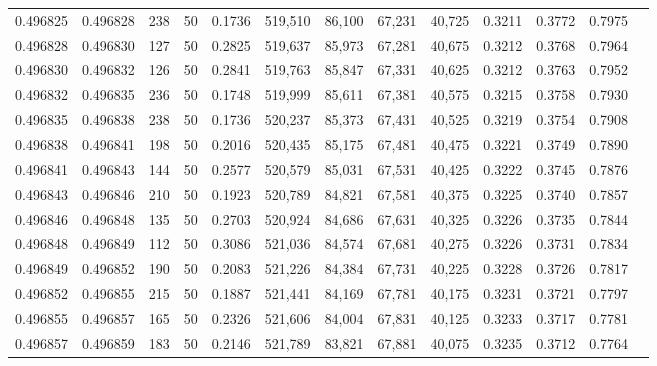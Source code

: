 \begin{tabular}{rrrrrrrrrrrrr}
0.496825 & 0.496828 &   238 &  50 &                                     0.1736 & 519,510 &  86,100 &  67,231 &  40,725 & 0.3211 & 0.3772 & 0.7975 \\
0.496828 & 0.496830 &   127 &  50 &                                     0.2825 & 519,637 &  85,973 &  67,281 &  40,675 & 0.3212 & 0.3768 & 0.7964 \\
0.496830 & 0.496832 &   126 &  50 &                                     0.2841 & 519,763 &  85,847 &  67,331 &  40,625 & 0.3212 & 0.3763 & 0.7952 \\
0.496832 & 0.496835 &   236 &  50 &                                     0.1748 & 519,999 &  85,611 &  67,381 &  40,575 & 0.3215 & 0.3758 & 0.7930 \\
0.496835 & 0.496838 &   238 &  50 &                                     0.1736 & 520,237 &  85,373 &  67,431 &  40,525 & 0.3219 & 0.3754 & 0.7908 \\
0.496838 & 0.496841 &   198 &  50 &                                     0.2016 & 520,435 &  85,175 &  67,481 &  40,475 & 0.3221 & 0.3749 & 0.7890 \\
0.496841 & 0.496843 &   144 &  50 &                                     0.2577 & 520,579 &  85,031 &  67,531 &  40,425 & 0.3222 & 0.3745 & 0.7876 \\
0.496843 & 0.496846 &   210 &  50 &                                     0.1923 & 520,789 &  84,821 &  67,581 &  40,375 & 0.3225 & 0.3740 & 0.7857 \\
0.496846 & 0.496848 &   135 &  50 &                                     0.2703 & 520,924 &  84,686 &  67,631 &  40,325 & 0.3226 & 0.3735 & 0.7844 \\
0.496848 & 0.496849 &   112 &  50 &                                     0.3086 & 521,036 &  84,574 &  67,681 &  40,275 & 0.3226 & 0.3731 & 0.7834 \\
0.496849 & 0.496852 &   190 &  50 &                                     0.2083 & 521,226 &  84,384 &  67,731 &  40,225 & 0.3228 & 0.3726 & 0.7817 \\
0.496852 & 0.496855 &   215 &  50 &                                     0.1887 & 521,441 &  84,169 &  67,781 &  40,175 & 0.3231 & 0.3721 & 0.7797 \\
0.496855 & 0.496857 &   165 &  50 &                                     0.2326 & 521,606 &  84,004 &  67,831 &  40,125 & 0.3233 & 0.3717 & 0.7781 \\
0.496857 & 0.496859 &   183 &  50 &                                     0.2146 & 521,789 &  83,821 &  67,881 &  40,075 & 0.3235 & 0.3712 & 0.7764 \\

\end{tabular}
